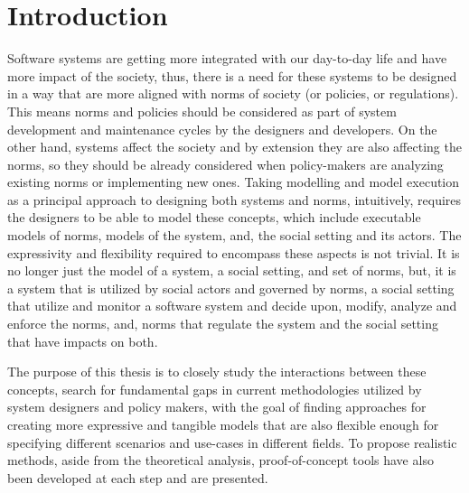 \chapter{Introduction}


Software systems are getting more integrated with our day-to-day life and have more impact of the society, thus, there is a need for these systems to be designed in a way that are more aligned with norms of society (or policies, or regulations)\cite{Something}. This means norms and policies should be considered as part of system development and maintenance cycles by the designers and developers. On the other hand, systems affect the society and by extension they are also affecting the norms, so they should be already considered when policy-makers are analyzing existing norms or implementing new ones. Taking modelling and model execution as a principal approach to designing both systems and norms, intuitively, requires the designers to be able to model these concepts, which include executable models of norms, models of the system, and, the social setting and its actors. The expressivity and flexibility required to encompass these aspects is not trivial. It is no longer just the model of a system, a social setting, and set of norms, but, it is a system that is utilized by social actors and governed by norms, a social setting that utilize and monitor a software system and decide upon, modify, analyze and enforce the norms, and, norms that regulate the system and the social setting that have impacts on both. 


The purpose of this thesis is to closely study the interactions between these concepts, search for fundamental gaps in current methodologies utilized by system designers and policy makers, with the goal of finding approaches for creating more expressive and tangible models that are also flexible enough for specifying different scenarios and use-cases in different fields. To propose realistic methods, aside from the theoretical analysis, proof-of-concept tools have also been developed at each step and are presented.

